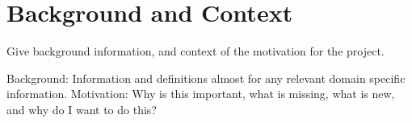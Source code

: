 \chapter*{Background and Context}

Give background information, and context of the motivation for the project.

Background: Information and definitions almost for any relevant domain specific information.
Motivation: Why is this important, what is missing, what is new, and why do I want to do this?
